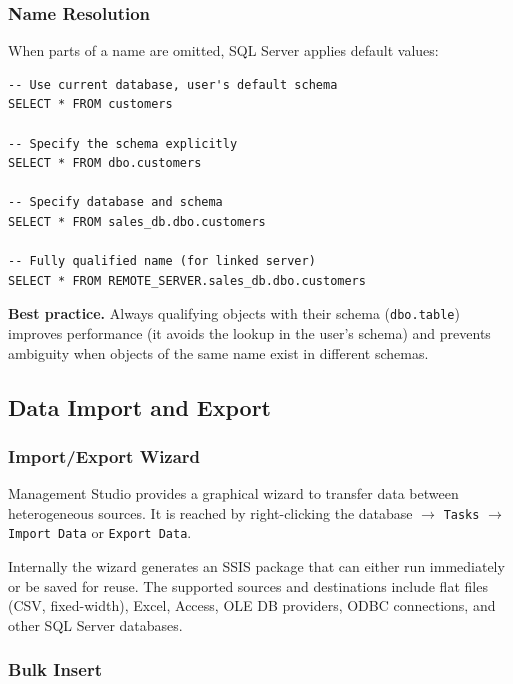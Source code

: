 \subsubsection{Name Resolution}
\label{subsec:name-resolution}

When parts of a name are omitted, SQL Server applies default values:

\begin{lstlisting}
-- Use current database, user's default schema
SELECT * FROM customers

-- Specify the schema explicitly
SELECT * FROM dbo.customers

-- Specify database and schema
SELECT * FROM sales_db.dbo.customers

-- Fully qualified name (for linked server)
SELECT * FROM REMOTE_SERVER.sales_db.dbo.customers
\end{lstlisting}

\begin{notebox}
\textbf{Best practice.}
Always qualifying objects with their schema (\texttt{dbo.table}) improves performance (it avoids the lookup in the user's schema) and prevents ambiguity when objects of the same name exist in different schemas.
\end{notebox}

\subsection{Data Import and Export}
\label{sec:import-export}

\subsubsection{Import/Export Wizard}
\label{subsec:import-export-wizard}

Management Studio provides a graphical wizard to transfer data between heterogeneous sources. It is reached by right-clicking the database $\rightarrow$ \texttt{Tasks} $\rightarrow$ \texttt{Import Data} or \texttt{Export Data}.

Internally the wizard generates an SSIS package that can either run immediately or be saved for reuse. The supported sources and destinations include flat files (CSV, fixed-width), Excel, Access, OLE DB providers, ODBC connections, and other SQL Server databases.

\subsubsection{Bulk Insert}
\label{subsec:bulk-insert}

